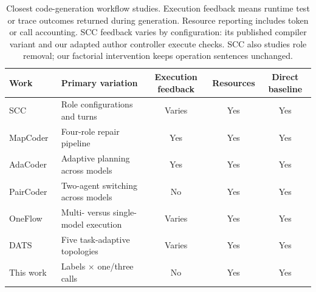 \begin{table}[t]
\caption{Closest code-generation workflow studies. Execution feedback means runtime test or trace outcomes returned during generation. Resource reporting includes token or call accounting. SCC feedback varies by configuration: its published compiler variant and our adapted author controller execute checks. SCC also studies role removal; our factorial intervention keeps operation sentences unchanged.}
\label{tab:related-designs}
\centering\scriptsize
\begin{tabularx}{\linewidth}{@{}lXccc@{}}
\toprule
Work & Primary variation & Execution feedback & Resources & Direct baseline\\
\midrule
SCC~\cite{dong2023selfcollaboration} & Role configurations and turns & Varies & Yes & Yes\\
MapCoder~\cite{islam2024mapcoder} & Four-role repair pipeline & Yes & Yes & Yes\\
AdaCoder~\cite{zhu2026adacoder} & Adaptive planning across models & Yes & Yes & Yes\\
PairCoder~\cite{chen2026paircoder} & Two-agent switching across models & No & Yes & Yes\\
OneFlow~\cite{xu2026oneflow} & Multi- versus single-model execution & Varies & Yes & Yes\\
DATS~\cite{hong2026dats} & Five task-adaptive topologies & Varies & Yes & Yes\\
This work & Labels $\times$ one/three calls & No & Yes & Yes\\
\bottomrule
\end{tabularx}
\end{table}
